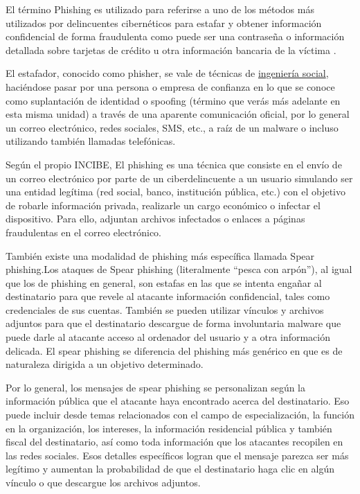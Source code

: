 \documentclass[
  a4paper,
  openany]{book}
\begin{document}
El término Phishing es utilizado para referirse a uno de los métodos más utilizados por delincuentes cibernéticos para estafar y obtener información confidencial de forma fraudulenta como puede ser una contraseña o información detallada sobre tarjetas de crédito u otra información bancaria de la víctima \citep{INFOSPY-phishing}.

El estafador, conocido como phisher, se vale de técnicas de \href{https://es.wikipedia.org/wiki/Ingeniería_social_(seguridad_informática)}{ingeniería social}, haciéndose pasar por una persona o empresa de confianza en lo que se conoce como suplantación de identidad o spoofing (término que verás más adelante en esta misma unidad) a través de una aparente comunicación oficial, por lo general un correo electrónico, redes sociales, SMS, etc., a raíz de un malware o incluso utilizando también llamadas telefónicas.

Según el propio INCIBE, El phishing es una técnica que consiste en el envío de un correo electrónico por parte de un ciberdelincuente a un usuario simulando ser una entidad legítima (red social, banco, institución pública, etc.) con el objetivo de robarle información privada, realizarle un cargo económico o infectar el dispositivo. Para ello, adjuntan archivos infectados o enlaces a páginas fraudulentas en el correo electrónico.

También existe una modalidad de phishing más específica llamada Spear phishing.Los ataques de Spear phishing (literalmente ``pesca con arpón''), al igual que los de phishing en general, son estafas en las que se intenta engañar al destinatario para que revele al atacante información confidencial, tales como credenciales de sus cuentas. También se pueden utilizar vínculos y archivos adjuntos para que el destinatario descargue de forma involuntaria malware que puede darle al atacante acceso al ordenador del usuario y a otra información delicada. El spear phishing se diferencia del phishing más genérico en que es de naturaleza dirigida a un objetivo determinado.

Por lo general, los mensajes de spear phishing se personalizan según la información pública que el atacante haya encontrado acerca del destinatario. Eso puede incluir desde temas relacionados con el campo de especialización, la función en la organización, los intereses, la información residencial pública y también fiscal del destinatario, así como toda información que los atacantes recopilen en las redes sociales. Esos detalles específicos logran que el mensaje parezca ser más legítimo y aumentan la probabilidad de que el destinatario haga clic en algún vínculo o que descargue los archivos adjuntos.\citep{PROOFPOINT-spear-phishing}
\end{document}

